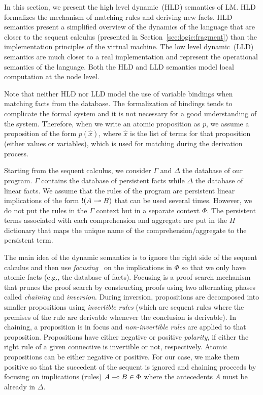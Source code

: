 
In this section, we present the high level dynamic~(HLD) semantics of LM. HLD
formalizes the mechanism of matching rules and deriving new facts. HLD
semantics present a simplified overview of the dynamics of the language that are
closer to the sequent calculus (presented in Section~\ref{sec:logic:fragment})
than the implementation principles of the virtual machine. The low level
dynamic~(LLD) semantics are much closer to a real implementation and
represent the operational semantics of the language. Both the HLD and LLD
semantics model local computation at the node level.

Note that neither HLD nor LLD model the use of variable bindings when
matching facts from the database. The formalization of bindings tends to
complicate the formal system and it is not necessary for a good understanding of
the system. Therefore, when we write an atomic proposition as $p$, we assume a
proposition of the form $p(\widehat{x})$, where $\widehat{x}$ is the list of
terms for that proposition (either values or variables), which is used for
matching during the derivation process.

Starting from the sequent calculus, we consider $\Gamma$ and $\Delta$ the
database of our program. $\Gamma$ contains the database of persistent facts
while $\Delta$ the database of linear facts. We assume that the rules of the
program are persistent linear implications of the form ${!} (A \multimap B)$ that
can be used several times. However, we do not put the rules in the $\Gamma$
context but in a separate context $\Phi$. The persistent terms associated with
each comprehension and aggregate are put in the $\Pi$ dictionary that maps the
unique name of the comprehension/aggregate to the persistent term.

	The main idea of the dynamic semantics is to ignore the right side of the
	sequent calculus and then use \emph{focusing}~\cite{Andreoli92logicprogramming} on the implications in $\Phi$ so that we only have atomic facts (e.g., the database of
	facts). Focusing is a proof search mechanism that prunes the proof search by constructing proofs using two alternating phases called
	\emph{chaining} and \emph{inversion}.
	During inversion, propositions are decomposed into smaller propositions using \emph{invertible rules} (which are sequent rules where the premises of the rule are derivable whenever the conclusion is derivable). In chaining,
	a proposition is in focus and \emph{non-invertible rules} are applied to that proposition.
	Propositions have either negative or positive \emph{polarity}, if either the right rule of a given connective is invertible or not, respectively. Atomic propositions can be either negative or positive. For our case, we make them positive so that the succedent of the sequent is ignored and chaining proceeds by focusing on implications (rules) $A \multimap B \in \Phi$ where the antecedents $A$ must be already in $\Delta$.

